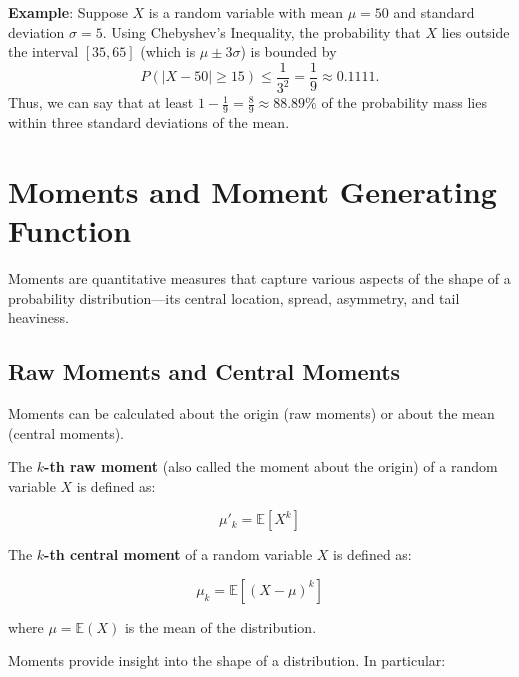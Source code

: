 \documentclass[twoside]{book}
\begin{document}
\vspace{3mm}

\textbf{Example}: Suppose $X$ is a random variable with mean $\mu = 50$ and standard deviation $\sigma = 5$. Using Chebyshev's Inequality, the probability that $X$ lies outside the interval $[35, 65]$ (which is $\mu \pm 3\sigma$) is bounded by
\[
P(|X - 50| \geq 15) \leq \frac{1}{3^2} = \frac{1}{9} \approx 0.1111.
\]
Thus, we can say that at least $1 - \frac{1}{9} = \frac{8}{9} \approx 88.89\%$ of the probability mass lies within three standard deviations of the mean.

\section{Moments and Moment Generating Function}

Moments are quantitative measures that capture various aspects of the shape of a probability distribution—its central location, spread, asymmetry, and tail heaviness.

\subsection{Raw Moments and Central Moments}

Moments can be calculated about the origin (raw moments) or about the mean (central moments). 

The \textbf{$k$-th raw moment} (also called the moment about the origin) of a random variable $X$ is defined as:
\begin{textbox}
    \[
\mu'_k = \mathbb{E}[X^k]
\]
\end{textbox}


The \textbf{$k$-th central moment} of a random variable $X$ is defined as:
\begin{textbox}
    \[
\mu_k = \mathbb{E}[(X - \mu)^k]
\]
\end{textbox}
where $\mu = \mathbb{E}(X)$ is the mean of the distribution.

Moments provide insight into the shape of a distribution.  In particular:
\end{document}
